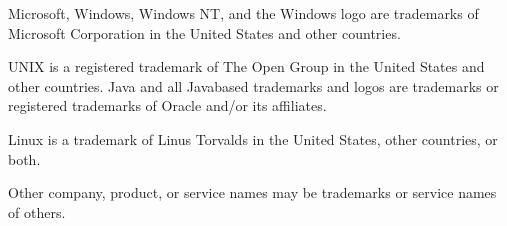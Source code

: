 \documentclass[letterpaper,10pt,english]{sphinxmanual}
\begin{document}
\sphinxAtStartPar
Microsoft, Windows, Windows NT, and the Windows logo are trademarks of Microsoft Corporation in the United States
and other countries.

\sphinxAtStartPar
UNIX is a registered trademark of The Open Group in the United States and other countries.
Java and all Java\sphinxhyphen{}based trademarks and logos are trademarks or registered trademarks of Oracle and/or its affiliates.

\sphinxAtStartPar
Linux is a trademark of Linus Torvalds in the United States, other countries, or both.

\sphinxAtStartPar
Other company, product, or service names may be trademarks or service names of others.



\renewcommand{\indexname}{Index}
\printindex
\end{document}
